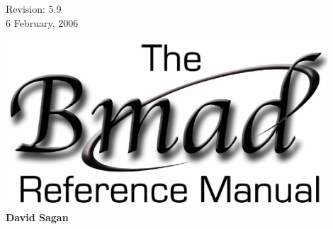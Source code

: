 \thispagestyle{empty}

\begin{flushright}
\large
  Revision: 5.9 \\
  6 February, 2006 \\
\end{flushright}

\vfill

{
\begin{center}
\includegraphics[width=12cm]{bmad_ref_manual.eps} \\
\vskip 0.3in
\huge\bf David Sagan
\end{center}
}

\vfill
\break
